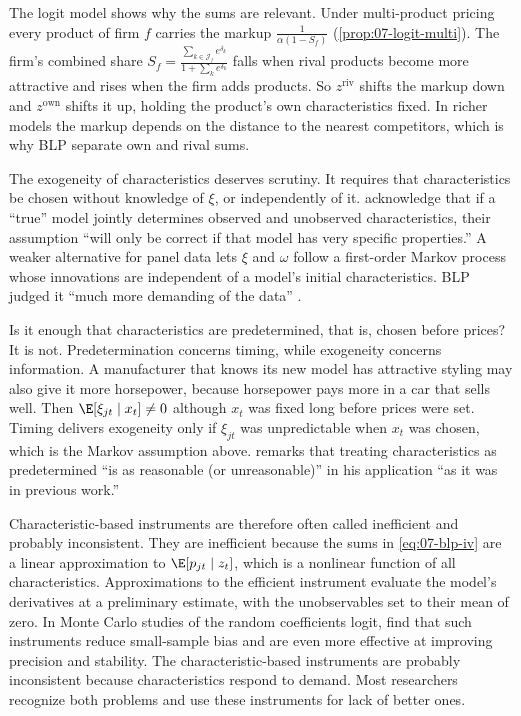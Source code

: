The logit model shows why the sums are relevant. Under multi-product pricing every product of firm $f$ carries the
markup $\frac{1}{\alpha(1 - S_f)}$ (\cref{prop:07-logit-multi}). The firm's combined share $S_f = \frac{\sum_{k \in
\mathcal{J}_f} e^{\delta_k}}{1 + \sum_{k} e^{\delta_k}}$ falls when rival products become more attractive and rises
when the firm adds products. So $z^{\mathrm{riv}}$ shifts the markup down and $z^{\mathrm{own}}$ shifts it up, holding
the product's own characteristics fixed. In richer models the markup depends on the distance to the nearest
competitors, which is why BLP separate own and rival sums.

The exogeneity of characteristics deserves scrutiny. It requires that characteristics be chosen without knowledge of
$\xi$, or independently of it. \citet[p.~854]{BerryLevinsohnPakes1995} acknowledge that if a ``true'' model jointly
determines observed and unobserved characteristics, their assumption ``will only be correct if that model has very
specific properties.'' A weaker alternative for panel data lets $\xi$ and $\omega$ follow a first-order Markov process
whose innovations are independent of a model's initial characteristics. BLP judged it ``much more demanding of the
data'' \citep[p.~855]{BerryLevinsohnPakes1995}.

Is it enough that characteristics are predetermined, that is, chosen before prices? It is not. Predetermination
concerns timing, while exogeneity concerns information. A manufacturer that knows its new model has attractive
styling may also give it more horsepower, because horsepower pays more in a car that sells well. Then $\E[\xi_{jt}
\mid x_t] \neq 0$ although $x_t$ was fixed long before prices were set. Timing delivers exogeneity only if $\xi_{jt}$
was unpredictable when $x_t$ was chosen, which is the Markov assumption above. \citet[p.~320]{Nevo2001} remarks that
treating characteristics as predetermined ``is as reasonable (or unreasonable)'' in his application ``as it was in
previous work.''

Characteristic-based instruments are therefore often called inefficient and probably inconsistent. They are
inefficient because the sums in \eqref{eq:07-blp-iv} are a linear approximation to $\E[p_{jt} \mid z_t]$, which is a
nonlinear function of all characteristics. Approximations to the efficient instrument evaluate the model's derivatives
at a preliminary estimate, with the unobservables set to their mean of zero. In Monte Carlo studies of the random
coefficients logit, \citet{ReynaertVerboven2014} find that such instruments reduce small-sample bias and are even
more effective at improving precision and stability. The characteristic-based instruments are probably inconsistent
because characteristics respond to demand. Most researchers recognize both problems and use these instruments for
lack of better ones.

